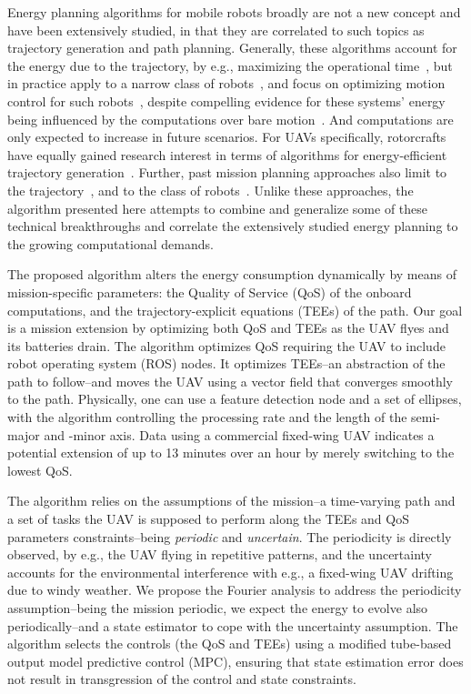 \documentclass[letterpaper,10pt,conference]{ieeeconf}
\begin{document}
Energy planning algorithms for mobile robots broadly are not a new concept and have been extensively studied, in that they are correlated to such topics as trajectory generation and path planning. Generally, these algorithms account for the energy due to the trajectory, by e.g., maximizing the operational time~\cite{wahab2015energy}, but in practice apply to a narrow class of robots~\cite{kim2005energy}, and focus on optimizing motion control for such robots~\cite{kim2008minimum}, despite compelling evidence for these systems' energy being influenced by the computations over bare motion~\cite{mei2004energy}. And computations are only expected to increase in future scenarios. For UAVs specifically, rotorcrafts have equally gained research interest in terms of algorithms for energy-efficient trajectory generation~\cite{morbidi2016minimum,kreciglowa2017energy}. Further, past mission planning approaches also limit to the trajectory~\cite{mei2004energy,mei2005case,mei2006deployment}, and to the class of robots~\cite{sadrpour2013mission,sadrpour2013experimental}. Unlike these approaches, the algorithm presented here attempts to combine and generalize some of these technical breakthroughs and correlate the extensively studied energy planning to the growing computational demands.

The proposed algorithm alters the energy consumption dynamically by means of mission-specific parameters: the Quality of Service (QoS) of the onboard computations, and the trajectory-explicit equations (TEEs) of the path. Our goal is a mission extension by optimizing both QoS and TEEs as the UAV flyes and its batteries drain. The algorithm optimizes QoS requiring the UAV to include robot operating system (ROS) nodes. It optimizes TEEs--an abstraction of the path to follow--and moves the UAV using a vector field that converges smoothly to the path. Physically, one can use a feature detection node and a set of ellipses, with the algorithm controlling the processing rate and the length of the semi-major and -minor axis. Data using a commercial fixed-wing UAV indicates a potential extension of up to 13 minutes over an hour by merely switching to the lowest QoS.

The algorithm relies on the assumptions of the mission--a time-varying path and a set of tasks the UAV is supposed to perform along the TEEs and QoS parameters constraints--being \emph{periodic} and \emph{uncertain}. The periodicity is directly observed, by e.g., the UAV flying in repetitive patterns, and the uncertainty accounts for the environmental interference with e.g., a fixed-wing UAV drifting due to windy weather. We propose the Fourier analysis to address the periodicity assumption--being the mission periodic, we expect the energy to evolve also periodically--and a state estimator to cope with the uncertainty assumption. The algorithm selects the controls (the QoS and TEEs) using a modified tube-based output model predictive control (MPC), ensuring that state estimation error does not result in transgression of the control and state constraints.
\end{document}
